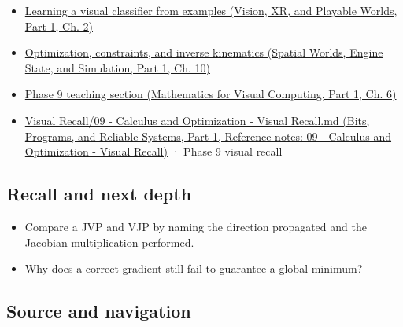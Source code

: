 \begin{itemize}
\tightlist
\item
  \href{../07-Vision-XR-and-Playable-Worlds-P01/main.pdf\#04-visual-computing-ii-ch031-learning-a-visual-classifier-from-examples}{Learning a visual classifier from examples (Vision, XR, and Playable Worlds, Part 1, Ch. 2)}
\item
  \href{../05-Spatial-Worlds-Engine-State-and-Simulation-P01/main.pdf\#04-visual-computing-ii-ch029-optimization-constraints-and-inverse-kinematics}{Optimization, constraints, and inverse kinematics (Spatial Worlds, Engine State, and Simulation, Part 1, Ch. 10)}
\item
  \href{../02-Mathematics-for-Visual-Computing-P01/main.pdf\#02-foundations-ii-ch022-numerical-differentiation-and-automatic-differentiation}{Phase 9 teaching section (Mathematics for Visual Computing, Part 1, Ch. 6)}
\item
  \href{../01-Bits-Programs-and-Reliable-Systems-P01/main.pdf\#appendix-adf48f5dc5c1}{Visual Recall/09 - Calculus and Optimization - Visual Recall.md (Bits, Programs, and Reliable Systems, Part 1, Reference notes: 09 - Calculus and Optimization - Visual Recall)} · Phase 9 visual recall
\end{itemize}

\subsection{Recall and next depth}\label{appendix-40df0855b4a7-recall-and-next-depth}

\hypertarget{appendix-40df0855b4a7-recall-and-next-depth}{}

\begin{itemize}
\tightlist
\item
  Compare a JVP and VJP by naming the direction propagated and the Jacobian multiplication performed.
\item
  Why does a correct gradient still fail to guarantee a global minimum?
\end{itemize}

\subsection{Source and navigation}\label{appendix-40df0855b4a7-source-and-navigation}

\hypertarget{appendix-40df0855b4a7-source-and-navigation}{}


